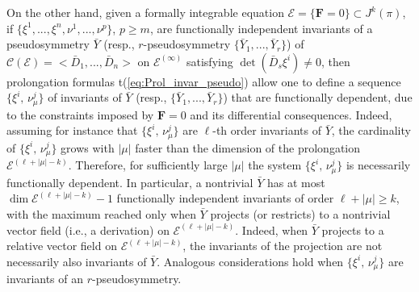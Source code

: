 \documentclass[12pt,english]{elsarticle}
\theoremstyle{plain}
\theoremstyle{plain}
\theoremstyle{remark}
\theoremstyle{plain}
\theoremstyle{definition}
\theoremstyle{definition}
\begin{document}
On the other hand, given a formally integrable equation
$\mathcal{E}=\{\mathbf{F}=0\}\subset J^{k}(\pi )$, if
$\big \{ \xi ^{1},...,\xi ^{n},\allowbreak \nu ^{1},...,\nu ^{p}\big \} $,
$p\geq m$, are functionally independent invariants of a pseudosymmetry
$\bar{Y}$ (resp., $r$-pseudosymmetry
$\{\bar{Y}_{1},...,\bar{Y}_{r}\}$) of
$\mathcal{\mathcal{C}}(\mathcal{E})=<\bar{D}_{1},...,\bar{D}_{n}>$ on
$\mathcal{E}^{(\infty )}$ satisfying
$\det \left (\bar{D}_{s}\xi ^{i}\right )\neq 0$, then prolongation formulas
t{(\ref{eq:Prol_invar_pseudo})} allow one to define a sequence
$\{\xi ^{i},\,\nu _{\mu}^{j}\}$ of invariants of $\bar{Y}$ (resp.,
$\{\bar{Y}_{1},...,\bar{Y}_{r}\}$) that are functionally dependent, due
to the constraints imposed by $\mathbf{F}=0$ and its differential consequences.
Indeed, assuming for instance that $\{\xi ^{i},\,\nu _{\mu}^{j}\}$ are
$\ell $-th order invariants of $\bar{Y}$, the cardinality of
$\{\xi ^{i},\,\nu _{\mu}^{j}\}$ grows with $|\mu |$ faster than the dimension
of the prolongation $\mathcal{E}^{(\ell +|\mu |-k)}$. Therefore, for sufficiently
large $|\mu |$ the system $\{\xi ^{i},\,\nu _{\mu}^{j}\}$ is necessarily
functionally dependent. In particular, a nontrivial $\bar{Y}$ has at most
$\dim \mathcal{E}^{(\ell +|\mu |-k)}-1$ functionally independent invariants
of order $\ell +|\mu |\geq k$, with the maximum reached only when
$\bar{Y}$ projects (or restricts) to a nontrivial vector field (i.e., a
derivation) on $\mathcal{E}^{(\ell +|\mu |-k)}$. Indeed, when
$\bar{Y}$ projects to a relative vector field on
$\mathcal{E}^{(\ell +|\mu |-k)}$, the invariants of the projection are
not necessarily also invariants of $\bar{Y}$. Analogous considerations
hold when $\{\xi ^{i},\,\nu _{\mu}^{j}\}$ are invariants of an $r$-pseudosymmetry.
\end{document}
